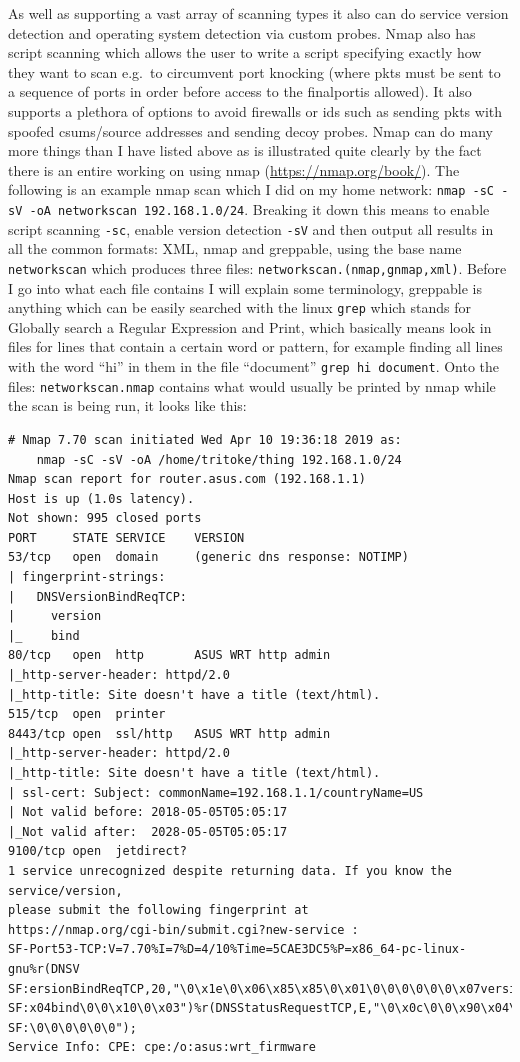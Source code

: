 \documentclass[titlepage]{article}
\begin{document}
As well as supporting a vast array of scanning types it also can do \gls{service} version detection 
and operating system detection via custom probes. Nmap also has script scanning which allows the 
user to write a script specifying exactly how they want to scan e.g.\ to circumvent \gls{port 
knocking} (where \glspl{pkt} must be sent to a sequence of \glspl{port} in order before access to 
the final\gls{port}is allowed). It also supports a plethora of options to avoid firewalls or 
\gls{ids} such as sending \glspl{pkt} with spoofed \glspl{csum}/source addresses and sending decoy 
probes. Nmap can do many more things than I have listed above as is illustrated quite clearly by the
fact there is an entire working on using nmap (\href{https://nmap.org/book/}{https://nmap.org/book/}).
The following is an example nmap scan
which I did on my home network: \verb|nmap -sC -sV -oA networkscan 192.168.1.0/24|. Breaking
it down this means to enable script scanning \verb|-sc|, enable version detection \verb|-sV|
and then output all results in all the common formats: XML, nmap and greppable, using the
base name \verb|networkscan| which produces three files: \verb|networkscan.(nmap,gnmap,xml)|.
Before I go into what each file contains I will explain some terminology, greppable is anything
which can be easily searched with the linux \verb|grep| which stands for Globally search a Regular
Expression and Print, which basically means look in files for lines that contain a certain word
or pattern, for example finding all lines with the word ``hi'' in them in the file ``document''
\verb|grep hi document|. Onto the files: \verb|networkscan.nmap| contains what would usually
be printed by nmap while the scan is being run, it looks like this:
\begin{verbatim}
# Nmap 7.70 scan initiated Wed Apr 10 19:36:18 2019 as:
    nmap -sC -sV -oA /home/tritoke/thing 192.168.1.0/24
Nmap scan report for router.asus.com (192.168.1.1)
Host is up (1.0s latency).
Not shown: 995 closed ports
PORT     STATE SERVICE    VERSION
53/tcp   open  domain     (generic dns response: NOTIMP)
| fingerprint-strings: 
|   DNSVersionBindReqTCP: 
|     version
|_    bind
80/tcp   open  http       ASUS WRT http admin
|_http-server-header: httpd/2.0
|_http-title: Site doesn't have a title (text/html).
515/tcp  open  printer
8443/tcp open  ssl/http   ASUS WRT http admin
|_http-server-header: httpd/2.0
|_http-title: Site doesn't have a title (text/html).
| ssl-cert: Subject: commonName=192.168.1.1/countryName=US
| Not valid before: 2018-05-05T05:05:17
|_Not valid after:  2028-05-05T05:05:17
9100/tcp open  jetdirect?
1 service unrecognized despite returning data. If you know the service/version,
please submit the following fingerprint at
https://nmap.org/cgi-bin/submit.cgi?new-service :
SF-Port53-TCP:V=7.70%I=7%D=4/10%Time=5CAE3DC5%P=x86_64-pc-linux-gnu%r(DNSV
SF:ersionBindReqTCP,20,"\0\x1e\0\x06\x85\x85\0\x01\0\0\0\0\0\0\x07version\
SF:x04bind\0\0\x10\0\x03")%r(DNSStatusRequestTCP,E,"\0\x0c\0\0\x90\x04\0\0
SF:\0\0\0\0\0\0");
Service Info: CPE: cpe:/o:asus:wrt_firmware
\end{verbatim}
\end{document}
